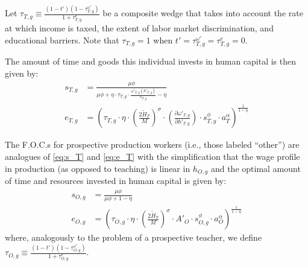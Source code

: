\documentclass[onehalfspacing,11pt]{article}
\begin{document}
Let $\tau_{T,g} \equiv \frac{\left( 1-t' \right) \left( 1-\tau^{\omega '}_{T,g} \right)}{1+\tau^e_{T,g}}$ be a composite wedge that takes into account the rate at which income is taxed, the extent of labor market discrimination, and educational barriers. Note that $\tau_{T,g}=1$ when $t' = \tau^{\omega '}_{T,g} = \tau^e_{T,g} = 0$.

The amount of time and goods this individual invests in human capital is then given by:
\begin{align}
\label{eq:s_T}
s_{T,g} & = \frac{\mu \phi}{\mu \phi+\eta \cdot \tau_{T,g} \cdot \tfrac{\omega'_{T,g}(h'_{T,g})}{e_{T,g}}-\eta}\\
\label{eq:e_T}
e_{T,g} & = \left( \tau_{T,g}\cdot \eta \cdot\left(\tfrac{2 \widetilde{H}_T}{M}\right)^\sigma \cdot\left(\tfrac{\partial \omega'_{T,g}}{\partial h'_{T,g}}\right) \cdot s_{T,g}^\phi \cdot a_T^\alpha \right)^{\frac{1}{1-\eta}}
\end{align}


The F.O.C.s for prospective production workers (i.e., those labeled ``other'') are analogues of \eqref{eq:s_T} and \eqref{eq:e_T} with the simplification that the wage profile in production (as opposed to teaching) is linear in $h_{O,g}$ and the optimal amount of time and resources invested in human capital is given by:
\begin{align}
s_{O,g} & = \frac{\mu \phi}{\mu \phi+1-\eta} \\
\label{eq:e_O}
e_{O,g} & = \left( \tau_{O,g} \cdot \eta \cdot \left(\tfrac{2\widetilde{H}_T}{M}\right)^\sigma\cdot {A'_{O}} \cdot s_{O,g}^\phi \cdot a_O^\alpha \right)^{\frac{1}{1-\eta}}
\end{align}
where, analogously to the problem of a prospective teacher, we define $\tau_{O,g} \equiv \frac{\left( 1-t' \right) \left( 1-\tau^{\omega '}_{O,g} \right)}{1+\tau^e_{O,g}}$.
\end{document}
